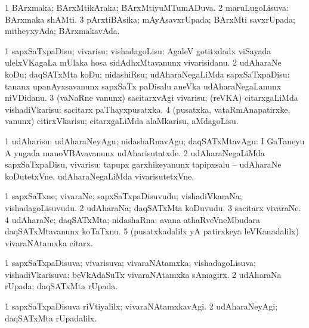 \bentry
{}
\gl{\gu}
\bmng
\bnum
\num{1} BArxmaka; BArxMtikAraka; BArxMtiyuMTumADuva. 
\num{2} maruLugoLisuva:  BArxmaka shAMti. 
\num{3} pArxtiBAsika; mAyAsavxrUpada; BArxMti savxrUpada; mitheyxyAda; BArxmakavAda. 
\enum
\emng
\eentry

\bentry
{}
\gl{\sakirx}
\bmng
\bnum
\num{1} sapxSaTxpaDisu; vivarisu; vishadagoLisu:  AgaleV gotitxdadx viSayada ulelxVKagaLa mUlaka hosa sidAdhxMtavanunx vivarisidanu. 
\num{2} udAharaNe koDu; daqSATxMta koDu; nidashiRsu; udAharaNegaLiMda sapxSaTxpaDisu:  tananx upanAyxsavanunx sapxSaTx paDisalu aneVka udAharaNegaLanunx niVDidanu. 
\num{3} (vaNaRne \mo vanunx) sacitarxvAgi vivarisu; (reVKA) citarxgaLiMda vishadiVkarisu:  sacitarx paThayxpusatxka. 
\num{4} (pusatxka, vataRmAnapatirxke, \mo vanunx) citirxVkarisu; citarxgaLiMda alaMkarisu, aMdagoLisu. 
\enum
\emng

\noindent
\gl{\akirx}
\bmng
\bnum
\num{1} udAharisu: udAharaNeyAgu; nidashaRnavAgu; daqSATxMtavAgu:  I GaTaneyu A yugada manoVBAvavanunx udAharisutatxde. 
\num{2} udAharaNegaLiMda sapxSaTxpaDisu, vivarisu:  tapupx garxhikeyanunx tapipxsalu -- udAharaNe koDutetxVne, udAharaNegaLiMda vivarisutetxVne. 
\enum
\emng
\eentry

\bentry
{}
\gl{\nA}
\bmng
\bnum
\num{1} sapxSaTxne; vivaraNe; sapxSaTxpaDisuvudu; vishadiVkaraNa; vishadagoLisuvudu. 
\num{2} udAharaNa; daqSATxMta koDuvudu. 
\num{3} sacitarx vivaraNe. 
\num{4} udAharaNe; daqSATxMta; nidashaRna:  avana athaRveVneMbudara daqSATxMtavanunx koTaTxnu. 
\num{5} (pusatxkadalilx yA patirxkeya leVKanadalilx) vivaraNAtamxka citarx. 
\enum
\emng
\eentry

\bentry
{}
\gl{\gu}
\bmng
\bnum
\num{1} sapxSaTxpaDisuva; vivarisuva; vivaraNAtamxka; vishadagoLisuva; vishadiVkarisuva:  beVkAdaSuTx vivaraNAtamxka sAmagirx. 
\num{2} udAharaNa rUpada; daqSATxMta rUpada. 
\enum
\emng
\eentry

\bentry
{}
\gl{\kirxvi}
\bmng
\bnum
\num{1} sapxSaTxpaDisuva riVtiyalilx; vivaraNAtamxkavAgi. 
\num{2} udAharaNeyAgi; daqSATxMta rUpadalilx. 
\enum
\emng
\eentry

